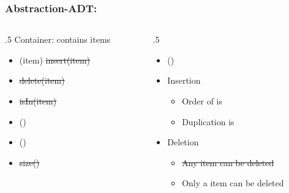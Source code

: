 \documentclass{beamer}
\begin{document}
\begin{frame}\frametitle{Abstraction-ADT: }
	\begin{columns}[T] %
	\begin{column}{.5\linewidth} %
	    	Container: contains items
		\begin{itemize}
			\item {}(item) \sout{insert(item)}
			\item {} \sout{delete(item)}
			\item \sout{isIn(item)}
			\item {}()
			\item {}()
			\item \sout{size()}			
		\end{itemize}
	\end{column} %
	\begin{column}{.5\linewidth} %
		\begin{itemize}

			\item
			 ()

			\item
			Insertion
			\begin{itemize}
				\item
				Order of is  
	
				\item
				Duplication is 
			\end{itemize}

			\item
			Deletion
			\begin{itemize}
				\item
				\sout{Any item can be deleted}
				
				\item
				Only a  item can be deleted
			\end{itemize}
		\end{itemize}
	\end{column} %
	\end{columns} %
\end{frame}




\end{document}

